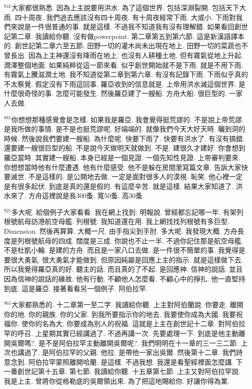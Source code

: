 \documentclass{book}
\begin{document}
$^{841}$大家都很熟悉.
因為上主說要用洪水.
為了這個世界.
包括深淵裂開.
包括天下大雨.
四十周夜.
我們過去應該沒有四十周夜.
有十周夜經常下雨.
大或小.
下雨對我們來說是一件很普通的事.
就是這樣.
不過我不知道我有沒有理解錯.
如果看回創世記第二章.
我讀給你聽.
沒有做powerpoint.
第二章第五到第六節.
這是新漢語譯本的.
創世記第二章六至五節.
田野一切的灌木尚未出現在地上.
田野一切的菜蔬也不曾長出.
因為上主神還沒有降雨在地上.
也沒有人耕種土地.
但有霧氣從地上升起.
潤澤整個地面.
如果純粹從這一節來看.
似乎創世開始就不是下雨.
就是不用下雨.
有霧氣上騰滋潤土地.
我不知道從第二章到第六章.
有沒有記錄下雨.
下雨似乎真的不太察覺.
假定沒有下雨這回事.
羅亞收到的信息就是.
上帝用洪水滅這個世界.
是什麼很奇怪的事.
怎麼可能發生.
然後羅亞建了一艘船.
方舟大船.
很巨型的.
一家人去做.

$^{881}$你想想那種感覺會是怎樣.
如果我是羅亞.
我會覺得挺荒謬的.
不是說上帝荒謬.
是我所做的事情.
是不是也挺荒謬呢.
好端端的.
就像我們今天大好天時.
曬到洞的時候.
然後說我們要建一艘船.
為什麼呢.
快要下雨了.
快要有洪水了.
有沒有搞錯.
還要建一艘很巨型的船.
不是說今天做明天就做到.
不是.
建很久才建好.
你會想到羅亞當時.
其實建一艘船.
本身已經是一個見證.
一個先知性見證.
上帝審判要來.
你想想當時他有什麼遭遇.
他有什麼感受.
他不是躲在房間里寫篇文章.
告訴大家快要滅世.
不是這樣的.
是公開地去做.
一定是面對很多人的漠視.
恥笑.
他心裡一定是有很多起伏.
到底是真的還是假的.
有這麼辛苦.
就是這樣.
結果大家知道了.
洪水來了.
方舟這裡說是長300蚤.
寬50蚤.
高30蚤.

$^{921}$多大呢.
給個例子大家看看.
我在網上找到.
明報說.
曾經都忘記哪一年.
有架列根號航母訪港航空母艦.
列根號.
我知道還在用.
我上網找找列根號有多巨型.
Dimension.
然後再算算.
大概一尺.
由手指尖到手肘.
多大呢.
我發現大概.
方舟長度是列根號航母的四成.
闊度是三成.
你說也不止一半.
不過你記住那是航空母艦.
不是杜凱小輪.
是建的方舟.
而且是一家八口去做.
是一件很不簡單的事.
我覺得是要很大勇氣.
很大勇氣才能做到.
但原因純屬是回應上主的指示.
就是這樣做下去.
所以我覺得羅亞真的好.
聽主的話.
而且真的了不起.
是回應神.
信神的說話.
並且因為信神的說話的緣故.
他有行動.
不顧他人怎麼看.
不顧心中的掙扎.
他一直堅持到底.
這是羅亞.
接著看看另一個例子.
阿伯拉罕.

$^{961}$大家都熟悉的.
十二章第一至二字.
我讀給你聽.
上主對阿伯蘭說.
你要走.
離開你的地.
你的親族.
你的父家.
到我所要指示你的地去.
我要使你成為大國.
我要祝福你.
使你的名為大.
你要成為別人的祝福.
這就是上主在創世記十二章.
對阿伯拉罕的呼召.
上星期其實已經講過了.
不過再講一次.
先要處理一下.
到底是他主動離開吳爾嗎?.
是不是阿伯拉罕主動離開吳爾呢?.
我們明明在十一章的三一三二節.
上次也講過了.
是阿伯拉罕的父親.
他拉.
是帶他一家出吳爾.
然後第十二章.
我們詩意念到.
阿伯拉罕蒙照離開哈蘭.
是這樣.
不過我想.
我還是看聖經裡面怎麼講.
下一番創世記第十五章.
第七節.
我讀給你聽.
十五章第七節.
上主又對阿伯拉罕說.
我是上主.
曾將你從格勒底的吳爾領出來.
為了把這地賜給你.
好讓你得為業.
\end{document}

